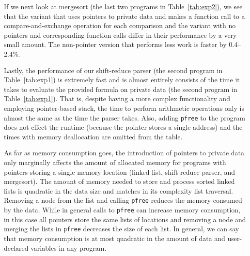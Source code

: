 \documentclass[11pt]{article}
\begin{document}
If we next look at mergesort (the last two programs in
Table~\ref{tab:exp2}), we see that the variant that uses pointers to private
data and makes a function call to a compare-and-exchange operation for each
comparison and the variant with no pointers and corresponding function calls
differ in their performance by a very small amount. The non-pointer version
that performs less work is faster by 0.4--2.4\%.

Lastly, the performance of our shift-reduce parser (the second program in
Table~\ref{tab:exp1}) is extremely fast and is almost entirely consists of
the time it takes to evaluate the provided formula on private data (the
second program in Table~\ref{tab:exp1}). That is, despite having a more
complex functionality and employing pointer-based stack, the time to perform
arithmetic operations only is almost the same as the time the parser takes.
Also, adding \texttt{pfree} to the program does not effect the runtime
(because the pointer stores a single address) and the times with
memory deallocation are omitted from the table. 

As far as memory consumption goes, the introduction of pointers to private
data only marginally affects the amount of allocated memory for programs
with pointers storing a single memory location (linked list, shift-reduce
parser, and mergesort). The amount of memory needed to store and process
sorted linked lists is quadratic in the data size and matches in its
complexity list traversal. Removing a node from the list and calling
\texttt{pfree} reduces the memory consumed by the data. While in general
calls to \texttt{pfree} can increase memory consumption, in this case all
pointers store the same lists of  locations and removing a node and
merging the lists in \texttt{pfree} decreases the size of each list. In
general, we can say that memory consumption is at most quadratic in the
amount of data and user-declared variables in any program.
\end{document}
